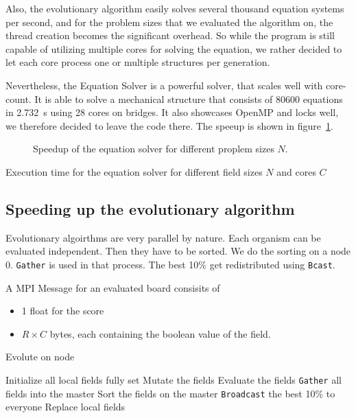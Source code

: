 \documentclass[12pt]{article}
\begin{document}
Also, the evolutionary algorithm easily solves several thousand equation systems per second, and for the problem sizes that we evaluated the algorithm on, the thread creation becomes the significant overhead. So while the program is still capable of utilizing multiple cores for solving the equation, we rather decided to let each core process one or multiple structures per generation.

Nevertheless, the Equation Solver is a powerful solver, that scales well with core-count. It is able to solve a mechanical structure that consists of 80600 equations in \SI{2.732}{\second} using 28 cores on bridges. It also showcases OpenMP and locks well, we therefore decided to leave the code there. The speeup is shown in figure~\ref{fig:Speedup}.

\begin{figure}[p]
    \centering
    
    \caption{Speedup of the equation solver for different proplem sizes $N$.}
    \label{fig:Speedup}
\end{figure}

\begin{table}[p]
    \centering
    
    \caption{Execution time for the equation solver for different field sizes $N$ and cores $C$}
    \label{tab:Speedup}
\end{table}

\subsection{Speeding up the evolutionary algorithm}

Evolutionary algoirthms are very parallel by nature. Each organism can be evaluated independent. Then they have to be sorted. We do the sorting on a node 0. \texttt{Gather} is used in that process. The best 10\% get redistributed using \texttt{Bcast}.

A MPI Message for an evaluated board consisits of

\begin{itemize}
    \item 1 float for the score
    \item $R \times C$ bytes, each containing the boolean value of the field.
\end{itemize}

\begin{algorithm}[t]
    \caption{Evolute on node}
    \begin{algorithmic}
        \STATE Initialize all local fields fully set
            \STATE Mutate the fields
            \STATE Evaluate the fields
            \STATE \texttt{Gather} all fields into the master
            \STATE Sort the fields on the master
            \STATE \texttt{Broadcast} the best 10\% to everyone
            \STATE Replace local fields
        \ENDFOR
    \end{algorithmic}
    \label{alg:Evolution}
\end{algorithm}
\end{document}
